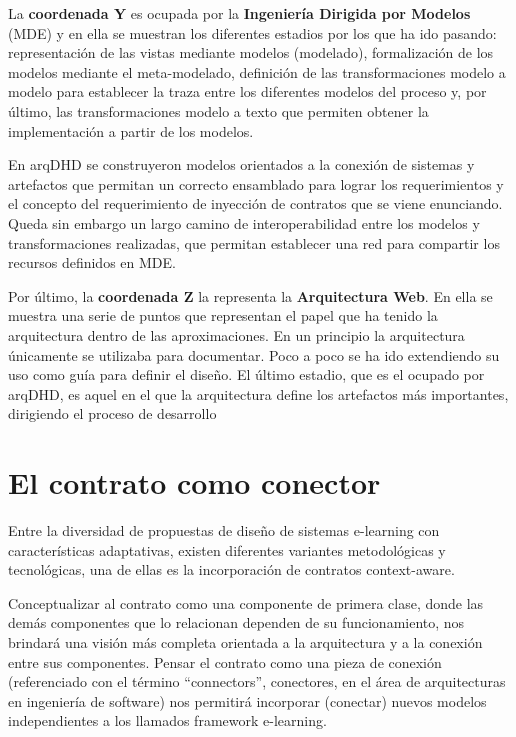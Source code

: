 La \textbf{coordenada Y} es ocupada por la \textbf{Ingeniería Dirigida por Modelos} (MDE) y en
ella se muestran los diferentes estadios por los que ha ido pasando:
representación de las vistas mediante modelos (modelado), formalización de los
modelos mediante el meta-modelado, definición de las transformaciones modelo a
modelo para establecer la traza entre los diferentes modelos del proceso y, por
último, las transformaciones modelo a texto que permiten obtener la
implementación a partir de los modelos.

En arqDHD se construyeron modelos orientados a la conexión de sistemas y artefactos que permitan un correcto ensamblado para lograr los requerimientos y el concepto del requerimiento de inyección de contratos que se viene enunciando. Queda sin embargo un largo
camino de interoperabilidad entre los modelos y transformaciones realizadas, que
permitan establecer una red para compartir los recursos definidos en MDE.


Por último, la \textbf{coordenada Z} la representa la \textbf{Arquitectura Web}. En ella se
muestra una serie de puntos que representan el papel que ha tenido la
arquitectura dentro de las aproximaciones. En un principio la arquitectura
únicamente se utilizaba para documentar. Poco a poco se ha ido extendiendo su
uso como guía para definir el diseño. El último estadio, que es el ocupado por
arqDHD, es aquel en el que la arquitectura define los artefactos más
importantes, dirigiendo el proceso de desarrollo


\section{El contrato como conector}

Entre la diversidad de propuestas de diseño de sistemas e-learning
con características adaptativas, existen diferentes variantes metodológicas y
tecnológicas, una de ellas es la incorporación de contratos context-aware. 

Conceptualizar al contrato como una componente de primera clase, donde las demás
componentes que lo relacionan dependen de su funcionamiento, nos brindará una
visión más completa orientada a la arquitectura y a la conexión entre sus
componentes.
Pensar el contrato como una pieza de conexión (referenciado con el término
“connectors”, conectores, en el área de arquitecturas en ingeniería de software)
nos permitirá incorporar (conectar) nuevos modelos independientes a los llamados framework e-learning.

